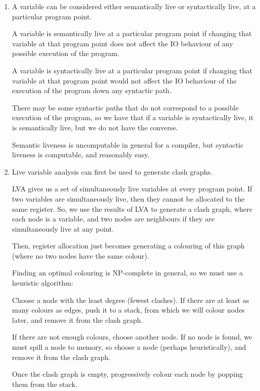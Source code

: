 


\begin{enumerate}[label=(\alph*)]
  \item
    A variable can be considered either semantically live or syntactically live, at a particular program point.

    A variable is semantically live at a particular program point if changing that variable at that program point does not affect the IO behaviour of any possible execution of the program.

    A variable is syntactically live at a particular program point if changing that variable at that program point would not affect the IO behaviour of the execution of the program down any syntactic path. 

    There may be some syntactic paths that do not correspond to a possible execution of the program, so we have that if a variable is syntactically live, it is semantically live, but we do not have the converse.

    Semantic liveness is uncomputable in general for a compiler, but syntactic liveness is computable, and reasonably easy.

  \item
    Live variable analysis can first be used to generate clash graphs.

    LVA gives us a set of simultaneously live variables at every program point. If two variables are simultaneously live, then they cannot be allocated to the same register. So, we use the results of LVA to generate a clash graph, where each node is a variable, and two nodes are neighbours if they are simultaneously live at any point.

    Then, register allocation just becomes generating a colouring of this graph (where no two nodes have the same colour).

    Finding an optimal colouring is NP-complete in general, so we must use a heuristic algorithm:

    Choose a node with the least degree (fewest clashes). If there are at least as many colours as edges, push it to a stack, from which we will colour nodes later, and remove it from the clash graph.

    If there are not enough colours, choose another node. If no node is found, we must spill a node to memory, so choose a node (perhaps heuristically), and remove it from the clash graph.

    Once the clash graph is empty, progressively colour each node by popping them from the stack.


\end{enumerate}
